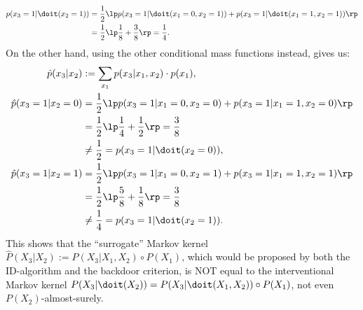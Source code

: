 \begin{Eg}
\begin{align*}
            p(x_3=1|\doit(x_2=1)) & = \frac{1}{2} \lp p(x_3=1|\doit(x_1=0,x_2=1)) + p(x_3=1|\doit(x_1=1,x_2=1)) \rp  \\ 
            &= \frac{1}{2} \lp \frac{1}{8} + \frac{3}{8}  \rp = \frac{1}{4}.
    \end{align*}
    On the other hand, using the other conditional mass functions instead, gives us:
    \begin{align*}
         \hat p(x_3|x_2) & := \sum_{x_1} p(x_3|x_1,x_2) \cdot p(x_1),\\
         \hat p(x_3=1|x_2=0) & = \frac{1}{2} \lp p(x_3=1|x_1=0,x_2=0) + p(x_3=1|x_1=1,x_2=0) \rp  \\
         &= \frac{1}{2} \lp \frac{1}{4} + \frac{1}{2} \rp = \frac{3}{8} \\& \neq \frac{1}{2} =p(x_3=1|\doit(x_2=0)), \\
         \hat p(x_3=1|x_2=1) & = \frac{1}{2} \lp p(x_3=1|x_1=0,x_2=1) + p(x_3=1|x_1=1,x_2=1) \rp  \\ 
         &= \frac{1}{2} \lp \frac{5}{8} + \frac{1}{8}  \rp = \frac{3}{8} \\& \neq \frac{1}{4} =p(x_3=1|\doit(x_2=1)).
     \end{align*}
     This shows that the ``surrogate'' Markov kernel $\hat P(X_3|X_2) := P(X_3|X_1,X_2) \circ P(X_1)$, 
     which would be proposed by both the ID-algorithm and the backdoor criterion, 
     is NOT equal to the interventional Markov kernel
     $P(X_3|\doit(X_2)) = P(X_3|\doit(X_1,X_2)) \circ P(X_1) $, not even $P(X_2)$-almost-surely.
 \end{Eg}

